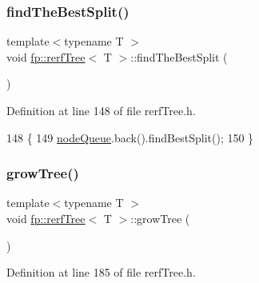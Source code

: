 \subsubsection{\texorpdfstring{find\+The\+Best\+Split()}{findTheBestSplit()}}
{\footnotesize\ttfamily template$<$typename T $>$ \\
void \hyperlink{classfp_1_1rerfTree}{fp\+::rerf\+Tree}$<$ T $>$\+::find\+The\+Best\+Split (\begin{DoxyParamCaption}{ }\end{DoxyParamCaption})\hspace{0.3cm}{\ttfamily [inline]}}



Definition at line 148 of file rerf\+Tree.\+h.


\begin{DoxyCode}
148                                               \{
149                     \hyperlink{classfp_1_1rerfTree_a59b3bdcba86acbe93fd46658132218a8}{nodeQueue}.back().findBestSplit();
150                 \}
\end{DoxyCode}
\mbox{\label{classfp_1_1rerfTree_ae352b72e40a7f16c0042a0ff10564b6b}} 
\subsubsection{\texorpdfstring{grow\+Tree()}{growTree()}}
{\footnotesize\ttfamily template$<$typename T $>$ \\
void \hyperlink{classfp_1_1rerfTree}{fp\+::rerf\+Tree}$<$ T $>$\+::grow\+Tree (\begin{DoxyParamCaption}{ }\end{DoxyParamCaption})\hspace{0.3cm}{\ttfamily [inline]}}



Definition at line 185 of file rerf\+Tree.\+h.


